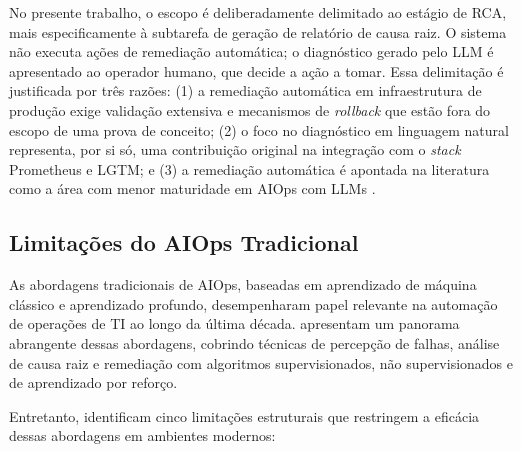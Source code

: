 No presente trabalho, o escopo é deliberadamente delimitado ao estágio de RCA, mais especificamente à subtarefa de geração de relatório de causa raiz. O sistema não executa ações de remediação automática; o diagnóstico gerado pelo LLM é apresentado ao operador humano, que decide a ação a tomar. Essa delimitação é justificada por três razões: (1) a remediação automática em infraestrutura de produção exige validação extensiva e mecanismos de \textit{rollback} que estão fora do escopo de uma prova de conceito; (2) o foco no diagnóstico em linguagem natural representa, por si só, uma contribuição original na integração com o \textit{stack} Prometheus e LGTM; e (3) a remediação automática é apontada na literatura como a área com menor maturidade em AIOps com LLMs \cite{zhang2024survey}.

\subsection{Limitações do AIOps Tradicional}
\label{subsec:limitacoes_aiops}

As abordagens tradicionais de AIOps, baseadas em aprendizado de máquina clássico e aprendizado profundo, desempenharam papel relevante na automação de operações de TI ao longo da última década.  apresentam um panorama abrangente dessas abordagens, cobrindo técnicas de percepção de falhas, análise de causa raiz e remediação com algoritmos supervisionados, não supervisionados e de aprendizado por reforço.

Entretanto,  identificam cinco limitações estruturais que restringem a eficácia dessas abordagens em ambientes modernos:

